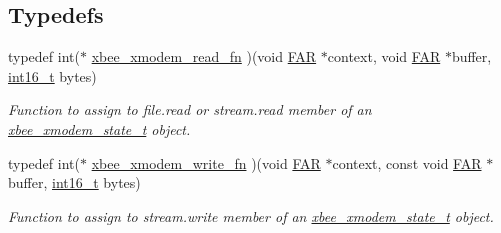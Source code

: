 \subsection*{Typedefs}
\begin{DoxyCompactItemize}
\item 
typedef int($\ast$ \hyperlink{group__util__xmodem_gae8f23aee23fead01c5b812e992799ded}{xbee\-\_\-xmodem\-\_\-read\-\_\-fn} )(void \hyperlink{group__hal_gaef060b3456fdcc093a7210a762d5f2ed}{F\-A\-R} $\ast$context, void \hyperlink{group__hal_gaef060b3456fdcc093a7210a762d5f2ed}{F\-A\-R} $\ast$buffer, \hyperlink{group__hal_ga2140805d08462d474b82ddc8d1c2f3e6}{int16\-\_\-t} bytes)
\begin{DoxyCompactList}\small\item\em Function to assign to {\ttfamily file.\-read} or {\ttfamily stream.\-read} member of an \hyperlink{structxbee__xmodem__state__t}{xbee\-\_\-xmodem\-\_\-state\-\_\-t} object. \end{DoxyCompactList}\item 
typedef int($\ast$ \hyperlink{group__util__xmodem_gad858784eff97e98dff61dda16fada3b2}{xbee\-\_\-xmodem\-\_\-write\-\_\-fn} )(void \hyperlink{group__hal_gaef060b3456fdcc093a7210a762d5f2ed}{F\-A\-R} $\ast$context, const void \hyperlink{group__hal_gaef060b3456fdcc093a7210a762d5f2ed}{F\-A\-R} $\ast$buffer, \hyperlink{group__hal_ga2140805d08462d474b82ddc8d1c2f3e6}{int16\-\_\-t} bytes)
\begin{DoxyCompactList}\small\item\em Function to assign to {\ttfamily stream.\-write} member of an \hyperlink{structxbee__xmodem__state__t}{xbee\-\_\-xmodem\-\_\-state\-\_\-t} object. \end{DoxyCompactList}\end{DoxyCompactItemize}
